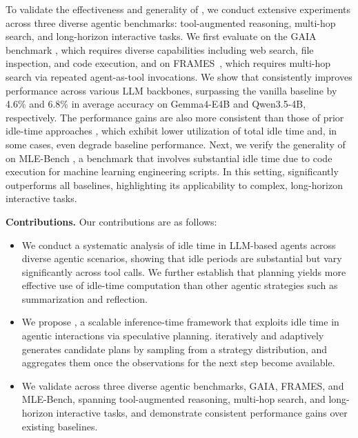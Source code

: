 To validate the effectiveness and generality of \mname, we conduct extensive experiments across three diverse agentic benchmarks: tool-augmented reasoning, multi-hop search, and long-horizon interactive tasks.
We first evaluate \mname on the GAIA benchmark \cite{mialon2023gaia}, which requires diverse capabilities including web search, file inspection, and code execution, and on FRAMES~\cite{krishna2024frames}, which requires multi-hop search via repeated agent-as-tool invocations.
We show that \mname consistently improves performance across various LLM backbones, \eg surpassing the vanilla baseline by 4.6\% and 6.8\% in average accuracy on Gemma4-E4B and Qwen3.5-4B, respectively. The performance gains are also more consistent than those of prior idle-time approaches \cite{lin2025sleeptime}, which exhibit lower utilization of total idle time and, in some cases, even degrade baseline performance. 
Next, we verify the generality of \mname on MLE-Bench \cite{chan2024mle-bench}, a benchmark that involves substantial idle time due to code execution for machine learning engineering scripts. In this setting, \mname significantly outperforms all baselines, highlighting its applicability to complex, long-horizon interactive tasks.

\textbf{Contributions.}
Our contributions are as follows:
\begin{itemize}
    \item We conduct a systematic analysis of idle time in LLM-based agents across diverse agentic scenarios, showing that idle periods are substantial but vary significantly across tool calls. We further establish that planning yields more effective use of idle-time computation than other agentic strategies such as summarization and reflection.
    
    \item We propose \mname, a scalable inference-time framework that exploits idle time in agentic interactions via speculative planning. 
    \mname iteratively and adaptively generates candidate plans by sampling from a strategy distribution, and aggregates them once the observations for the next step become available. 
    
    \item We validate \mname across three diverse agentic benchmarks, \ie GAIA, FRAMES, and MLE-Bench, spanning tool-augmented reasoning, multi-hop search, and long-horizon interactive tasks, and demonstrate consistent performance gains over existing baselines. 
\end{itemize}



